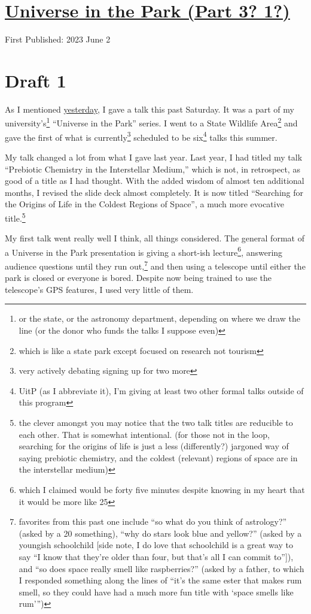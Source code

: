 \documentclass[12pt]{article}[titlepage]
\newcommand{\say}[1]{``#1''}
\newcommand{\nsay}[1]{`#1'}
\newcommand{\1}{\={a}}
\newcommand{\2}{\={e}}
\newcommand{\3}{\={\i}}
\newcommand{\4}{\=o}
\newcommand{\5}{\=u}
\newcommand{\6}{\={A}}
\renewcommand{\,}{\textsuperscript{,}}
\begin{document}
\doublespacing
\section{\href{universe.html}{Universe in the Park (Part 3? 1?)}}
First Published: 2023 June 2
\section{Draft 1}
As I mentioned \href{reflection-may-23.html}{yesterday}, I gave a talk this past Saturday.
It was a part of my university's\footnote{or the state, or the astronomy department, depending on where we draw the line (or the donor who funds the talks I suppose even)} \say{Universe in the Park} series.
I went to a State Wildlife Area\footnote{which is like a state park except focused on research not tourism} and gave the first of what is currently\footnote{very actively debating signing up for two more} scheduled to be six\footnote{UitP (as I abbreviate it), I'm giving at least two other formal talks outside of this program} talks this summer.

My talk changed a lot from what I gave last year.
Last year, I had titled my talk \say{Prebiotic Chemistry in the Interstellar Medium,} which is not, in retrospect, as good of a title as I had thought.
With the added wisdom of almost ten additional months, I revised the slide deck almost completely.
It is now titled \say{Searching for the Origins of Life in the Coldest Regions of Space}, a much more evocative title.\footnote{the clever amongst you may notice that the two talk titles are reducible to each other. That is somewhat intentional. (for those not in the loop, searching for the origins of life is just a less (differently?) jargoned way of saying prebiotic chemistry, and the coldest (relevant) regions of space are in the interstellar medium)}

My first talk went really well I think, all things considered.
The general format of a Universe in the Park presentation is giving a short-ish lecture\footnote{which I claimed would be forty five minutes despite knowing in my heart that it would be more like 25}, answering audience questions until they run out,\footnote{favorites from this past one include \say{so what do you think of astrology?} (asked by a 20 something), \say{why do stars look blue and yellow?} (asked by a youngish schoolchild [side note, I do love that schoolchild is a great way to say \say{I know that they're older than four, but that's all I can commit to}]), and \say{so does space really smell like raspberries?} (asked by a father, to which I responded something along the lines of \say{it's the same ester that makes rum smell, so they could have had a much more fun title with \nsay{space smells like rum}})} and then using a telescope until either the park is closed or everyone is bored.
Despite now being trained to use the telescope's GPS features, I used very little of them.
\end{document}
